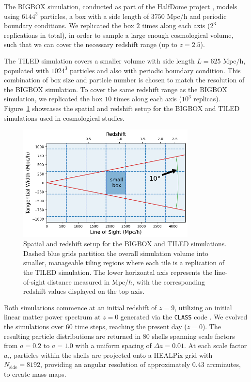The BIGBOX simulation, conducted as part of the HalfDome project \citep{2024arXiv240717462B}, models using $6144^3$ particles, a box with a side length of $3750$ Mpc/h and periodic boundary conditions. We replicated the box $2$ times along each axis ($2^3$ replications in total), in order to sample a large enough cosmological volume, such that we can cover the necessary redshift range (up to $z = 2.5$). 

The TILED simulation covers a smaller volume with side length $L = 625$ Mpc/h, populated with $1024^3$ particles and also with periodic boundary condition. This combination of box size and particle number is chosen to match the resolution of the BIGBOX simulation. To cover the same redshift range as the BIGBOX simulation, we replicated the box $10$ times along each axis ($10^3$ replicas). Figure~\ref{fig:simulationsetting} showcases the spatial and redshift setup for the BIGBOX and TILED simulations used in cosmological studies. 

\begin{figure}[ht]
    \centering
    \includegraphics[width=0.8\textwidth]{figures/light_cone_configuration.png}
    \caption[Spatial and redshift setup for the BIGBOX and TILED simulations]{Spatial and redshift setup for the BIGBOX and TILED simulations. Dashed blue grids partition the overall simulation volume into smaller, manageable tiling regions where each tile is a replication of the TILED simulation. The lower horizontal axis represents the line-of-sight distance measured in $\mathrm{Mpc}/h$, with the corresponding redshift values displayed on the top axis.} \label{fig:simulationsetting}
\end{figure}

Both simulations commence at an initial redshift of $z = 9$, utilizing an initial linear matter power spectrum at $z = 0$ generated via the \texttt{CLASS} code \citep{2011JCAP...07..034B}. We evolved the simulations over $60$ time steps, reaching the present day ($z = 0$). The resulting particle distributions are returned in $80$ shells spanning scale factors from $a = 0.2$ to $a = 1.0$ with a uniform spacing of $\Delta a = 0.01$. At each scale factor $a_i$, particles within the shells are projected onto a HEALPix grid \citep{Górski_2005} with $N_{\text{side}} = 8192$, providing an angular resolution of approximately $0.43$ arcminutes, to create mass maps.

